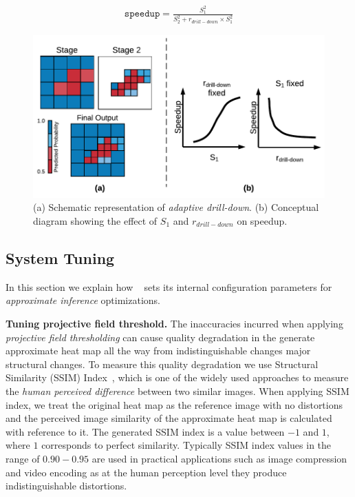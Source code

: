 \begin{align}
\label{eqn:adaptive-drill-down-eqn}
\texttt{speedup} = \frac{S^2_1}{S^2_2+r_{drill-down} \times S^2_1}
\end{align}

\begin{figure}[t]
\includegraphics[width=\columnwidth]{images/adaptive_drill_down}
\caption{(a) Schematic representation of \textit{adaptive drill-down}. (b) Conceptual diagram showing the effect of $S_1$ and $r_{drill-down}$ on speedup. }
\label{fig:adaptive_drill_down}
\end{figure}

\subsection{System Tuning}
In this section we explain how \system~ sets its internal configuration parameters for \textit{approximate inference} optimizations.

\vspace{2mm}
\noindent \textbf{Tuning projective field threshold.}
The inaccuracies incurred when applying \textit{projective field thresholding} can cause quality degradation in the generate approximate heat map all the way from indistinguishable changes major structural changes.
To measure this quality degradation we use Structural Similarity (SSIM) Index~\cite{wang2004image}, which is one of the widely used approaches to measure the \textit{human perceived difference} between two similar images.
When applying SSIM index, we treat the original heat map as the reference image with no distortions and the perceived image similarity of the approximate heat map is calculated with reference to it.
The generated SSIM index is a value between $-1$ and $1$, where $1$ corresponds to perfect similarity.
Typically SSIM index values in the range of $0.90-0.95$ are used in practical applications such as image compression and video encoding as at the human perception level they produce indistinguishable distortions.

